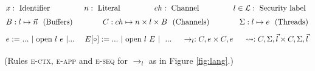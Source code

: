 \documentclass[10pt,preprint]{sigplanconf}
\renewcommand{\t}[1]{~\text{#1}~}
\begin{document}
\begin{figure*}
\[ \arraycolsep=1.6pt\def\arraystretch{1.5}
\begin{array}{rl}
  \multicolumn{2}{l}{x : \t{Identifier} \hfill n : \t{Literal} \hfill ch : \t{Channel} \hfill l \in \mathcal{L} : \t{Security label}} \\
  \multicolumn{2}{l}{
    B : l \mapsto \vec{n} ~~(\text{Buffers})~~\hfill~~
    C : ch \mapsto n \times l \times B~~(\text{Channels})~~\hfill~~
    \Sigma : l \mapsto e ~~(\text{Threads})} \\[1ex]
  e := & ... ~| \t{open} l~e ~| ...~~\hfill~~
    E[\circ] := ...~| \t{open} l~E~| ~~...~~\hfill~~\rightarrow_l : C,e \times C,e ~~\hfill~~ \leadsto : C, \Sigma, \vec{l} \times C, \Sigma, \vec{l}
  \end{array} \\
\]

\begin{center}
  (Rules \textsc{e-ctx}, \textsc{e-app} and \textsc{e-seq} for $\rightarrow_l$ as in Figure \ref{fig:lang}.) \\[1em]


\end{center}
\end{figure*}
\end{document}
